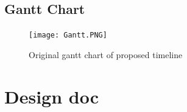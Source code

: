 \documentclass[onecolumn, draftclsnofoot,10pt, compsoc]{IEEEtran}
\begin{document}
\subsection{Gantt Chart}

\begin{figure}[!htb]
    \texttt{[image: Gantt.PNG]}
    \caption{Original gantt chart of proposed timeline}
    \label{fig:Gantt Chart}
\end{figure}


\section{Design doc}
\end{document}
